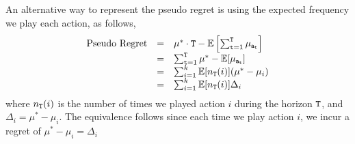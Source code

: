 An alternative way to represent the pseudo regret is using the expected frequency we play each action, as follows,
\[
\begin{array}{ccl}
\text{Pseudo Regret} & = & \mu^{*}\cdot {\tt T}- \mathbb{E}\left[\sum_{{\tt t}=1}^{{\tt T}}\mu_{{\tt a}_{{\tt t}}}\right]\\
 & = & \sum_{{\tt t}=1}^{{\tt T}} \mu^* - \mathbb{E}[\mu_{{\tt a}_{{\tt t}}}] \\
 & = & \sum_{i=1}^k \mathbb{E}[n_{\tt T}(i)] (\mu^*-\mu_i)\\
  & = & \sum_{i=1}^k \mathbb{E}[n_{\tt T}(i)] \Delta_i
\end{array}
\]
where $n_{\tt T}(i)$ is the number of times we played action $i$ during the horizon ${\tt T}$, and $\Delta_i=\mu^*-\mu_i$.
The equivalence follows since each time we play action $i$, we incur a regret of $\mu^*-\mu_i= \Delta_i$





